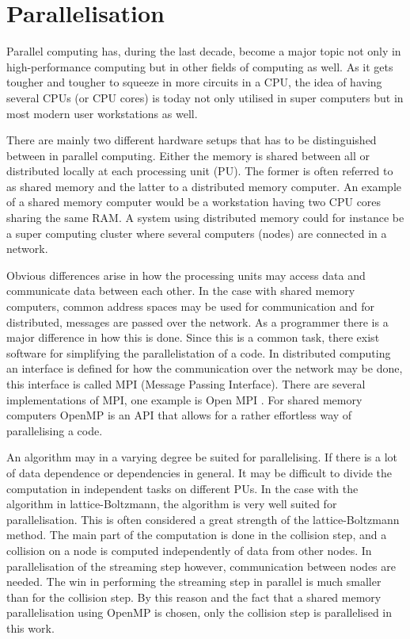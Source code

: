 \section{Parallelisation}

Parallel computing has, during the last decade, become a major topic
not only in high-performance computing but in other fields of
computing as well. As it gets tougher and tougher to squeeze in more
circuits in a CPU, the idea of having several CPUs (or CPU cores) is
today not only utilised in super computers but in most modern user
workstations as well.

There are mainly two different hardware setups that has to be
distinguished between in parallel computing. Either the memory is
shared between all or distributed locally at each processing unit
(PU). The former is often referred to as shared memory and the latter
to a distributed memory computer. An example of a shared memory
computer would be a workstation having two CPU cores sharing the same
RAM. A system using distributed memory could for instance be a super
computing cluster where several computers (nodes) are connected in a
network.

Obvious differences arise in how the processing units may access data
and communicate data between each other.  In the case with shared
memory computers, common address spaces may be used for communication
and for distributed, messages are passed over the network. As a
programmer there is a major difference in how this is done. Since this
is a common task, there exist software for simplifying the
parallelistation of a code. In distributed computing an interface is
defined for how the communication over the network may be done, this
interface is called MPI (Message Passing Interface). There are several
implementations of MPI, one example is Open MPI \cite{openmpi}. For
shared memory computers OpenMP \cite{openmp} is an API that allows for
a rather effortless way of parallelising a code.

An algorithm may in a varying degree be suited for parallelising. If
there is a lot of data dependence or dependencies in general. It may
be difficult to divide the computation in independent tasks on
different PUs. In the case with the algorithm in lattice-Boltzmann,
the algorithm is very well suited for parallelisation. This is often
considered a great strength of the lattice-Boltzmann method. The
main part of the computation is done in the collision step, and a
collision on a node is computed independently of data from other
nodes. In parallelisation of the streaming step however, communication
between nodes are needed. The win in performing the streaming step in
parallel is much smaller than for the collision step. By this reason
and the fact that a shared memory parallelisation using OpenMP is
chosen, only the collision step is parallelised in this work.

